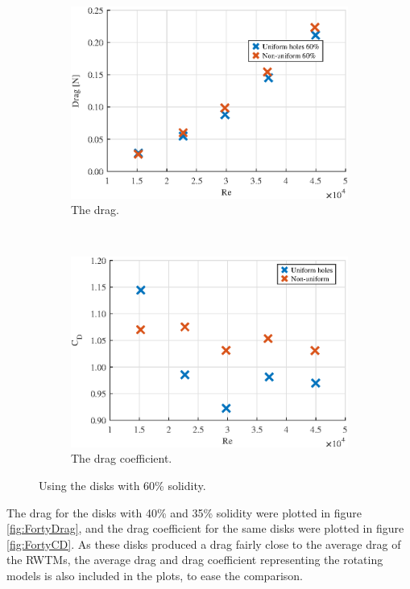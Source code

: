 \begin{figure} 
    \centering
    \begin{subfigure}[b]{0.45\linewidth}
        \includegraphics[width=\textwidth]{0_Images/SixtyDragRe.eps}
        \caption{The drag.}
        \label{Fig:SixtyDrag}
    \end{subfigure}
    ~
    \begin{subfigure}[b]{0.45\linewidth}
        \includegraphics[width=\textwidth]{0_Images/SixtyCDRe.eps}
        \caption{The drag coefficient.}
        \label{Fig:SixtyCD}
    \end{subfigure}
    \caption[Drag and drag coefficient of disks with 60\% solidity.]{Using the disks with 60\% solidity.}
    \label{fig:SixtyDisk}
\end{figure}


The drag for the disks with 40\% and 35\% solidity were plotted in figure \ref{fig:FortyDrag}, and the drag coefficient for the same disks were plotted in figure \ref{fig:FortyCD}. As these disks produced a drag fairly close to the average drag of the \gls{RWTM}s, the average drag and drag coefficient representing the rotating models is also included in the plots, to ease the comparison. 


